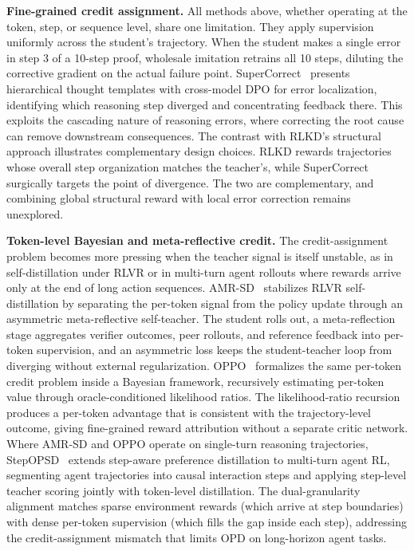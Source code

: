 \documentclass{article} %
\begin{document}
\textbf{Fine-grained credit assignment.} All methods above, whether operating at the token, step, or sequence level, share one limitation. They apply supervision uniformly across the student's trajectory. When the student makes a single error in step 3 of a 10-step proof, wholesale imitation retrains all 10 steps, diluting the corrective gradient on the actual failure point. SuperCorrect~\citep{2410.09008} presents hierarchical thought templates with cross-model DPO for error localization, identifying which reasoning step diverged and concentrating feedback there. This exploits the cascading nature of reasoning errors, where correcting the root cause can remove downstream consequences. The contrast with RLKD's structural approach illustrates complementary design choices. RLKD rewards trajectories whose overall step organization matches the teacher's, while SuperCorrect surgically targets the point of divergence. The two are complementary, and combining global structural reward with local error correction remains unexplored.

\textbf{Token-level Bayesian and meta-reflective credit.} The credit-assignment problem becomes more pressing when the teacher signal is itself unstable, as in self-distillation under RLVR or in multi-turn agent rollouts where rewards arrive only at the end of long action sequences. AMR-SD~\citep{2605.18529} stabilizes RLVR self-distillation by separating the per-token signal from the policy update through an asymmetric meta-reflective self-teacher. The student rolls out, a meta-reflection stage aggregates verifier outcomes, peer rollouts, and reference feedback into per-token supervision, and an asymmetric loss keeps the student-teacher loop from diverging without external regularization. OPPO~\citep{2605.21851} formalizes the same per-token credit problem inside a Bayesian framework, recursively estimating per-token value through oracle-conditioned likelihood ratios. The likelihood-ratio recursion produces a per-token advantage that is consistent with the trajectory-level outcome, giving fine-grained reward attribution without a separate critic network. Where AMR-SD and OPPO operate on single-turn reasoning trajectories, StepOPSD~\citep{2605.27140} extends step-aware preference distillation to multi-turn agent RL, segmenting agent trajectories into causal interaction steps and applying step-level teacher scoring jointly with token-level distillation. The dual-granularity alignment matches sparse environment rewards (which arrive at step boundaries) with dense per-token supervision (which fills the gap inside each step), addressing the credit-assignment mismatch that limits OPD on long-horizon agent tasks.
\end{document}
